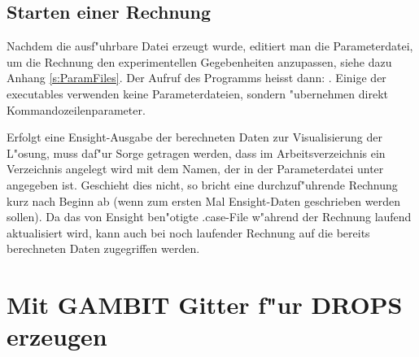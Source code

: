 \subsection{Starten einer Rechnung}
Nachdem die ausf"uhrbare Datei erzeugt wurde, editiert man die Parameterdatei, um
die Rechnung den experimentellen Gegebenheiten anzupassen, siehe dazu Anhang \ref{s:ParamFiles}. 
Der Aufruf des Programms heisst dann: . 
Einige der executables verwenden keine Parameterdateien, sondern "ubernehmen 
direkt Kommandozeilenparameter. 

Erfolgt eine Ensight-Ausgabe der berechneten Daten zur Visualisierung der L"osung, muss daf"ur
Sorge getragen werden, dass im Arbeitsverzeichnis ein Verzeichnis angelegt wird mit dem Namen,
der in der Parameterdatei unter  angegeben ist. Geschieht dies nicht, so
bricht eine durchzuf"uhrende Rechnung kurz nach Beginn ab (wenn zum ersten Mal Ensight-Daten
geschrieben werden sollen). Da das von Ensight ben"otigte .case-File w"ahrend der
Rechnung laufend aktualisiert wird, kann auch bei noch laufender Rechnung auf
die bereits berechneten Daten zugegriffen werden.
 
\section{Mit GAMBIT Gitter f"ur DROPS erzeugen}
\label{s:Gambit}

